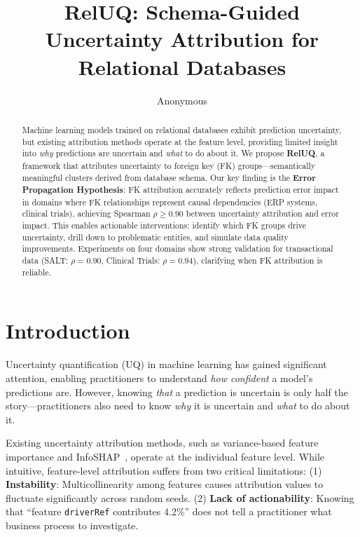 \documentclass{article}
\title{RelUQ: Schema-Guided Uncertainty Attribution for Relational Databases}
\author{Anonymous}
\begin{document}
\maketitle

\begin{abstract}
Machine learning models trained on relational databases exhibit prediction uncertainty,
but existing attribution methods operate at the feature level, providing limited insight
into \emph{why} predictions are uncertain and \emph{what} to do about it.
We propose \textbf{RelUQ}, a framework that attributes uncertainty to foreign key (FK)
groups---semantically meaningful clusters derived from database schema.
Our key finding is the \textbf{Error Propagation Hypothesis}: FK attribution accurately
reflects prediction error impact in domains where FK relationships represent causal
dependencies (ERP systems, clinical trials), achieving Spearman $\rho \geq 0.90$ between
uncertainty attribution and error impact.
This enables actionable interventions: identify which FK groups drive uncertainty,
drill down to problematic entities, and simulate data quality improvements.
Experiments on four domains show strong validation for transactional data
(SALT: $\rho = 0.90$, Clinical Trials: $\rho = 0.94$), clarifying when FK attribution is reliable.
\end{abstract}

\section{Introduction}
\label{sec:intro}

Uncertainty quantification (UQ) in machine learning has gained significant attention,
enabling practitioners to understand \emph{how confident} a model's predictions are.
However, knowing \emph{that} a prediction is uncertain is only half the story---practitioners
also need to know \emph{why} it is uncertain and \emph{what} to do about it.

Existing uncertainty attribution methods, such as variance-based feature importance
and InfoSHAP~\citep{watson2023testing}, operate at the individual feature level.
While intuitive, feature-level attribution suffers from two critical limitations:
(1) \textbf{Instability}: Multicollinearity among features causes attribution values
to fluctuate significantly across random seeds.
(2) \textbf{Lack of actionability}: Knowing that ``feature \texttt{driverRef} contributes 4.2\%''
does not tell a practitioner what business process to investigate.
\end{document}
